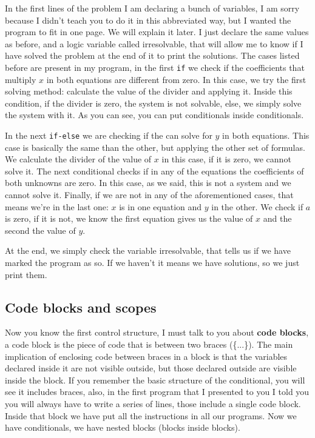 \documentclass[a4paper]{article}
\begin{document}
In the first lines of the problem I am declaring a bunch of variables, I am
sorry because I didn't teach you to do it in this abbreviated way, but I wanted
the program to fit in one page. We will explain it later. I just declare
the same values as before, and a logic variable called irresolvable, that will
allow me to know if I have solved the problem at the end of it to
print the solutions.
The cases listed before are  present in my program, in the first \texttt{if}
we check if the coefficients that multiply $x$ in both equations are different
from zero. In this case, we try the first solving method: calculate the value
of the divider and applying it. Inside this condition, if the divider is zero,
the system is not solvable, else, we simply solve the system with it.
As you can see, you can put conditionals inside conditionals.

In the next \texttt{if-else} we are checking if the can solve for $y$ in both
equations. This case is basically the same than the other, but applying the
other set of formulas. We calculate the divider of the value of $x$ in this
case, if it is zero, we cannot solve it.
The next conditional checks if in any of the equations the coefficients of
both unknowns are zero. In this case, as we said, this is not a system and we
cannot solve it.
Finally, if we are not in any of the aforementioned cases, that means we're in
the last one: $x$ is in one equation and $y$ in the other. We check if $a$ is
zero, if it is not, we know the first equation gives us the value of $x$ and
the second the value of $y$.

At the end, we simply check the variable irresolvable, that tells us if we have
marked the program as so. If we haven't it means we have solutions, so we just
print them.

\subsection{Code blocks and scopes}
Now you know the first control structure, I must talk to you about \textbf{code
blocks}, a code block is the piece of code that is between two braces (\{...\}).
The main implication of enclosing code between braces in a block is that the
variables declared inside it are not visible outside, but those declared outside
are visible inside the block.
If you remember the basic structure of the conditional, you will see it includes
braces, also, in the first program that I presented to you I told you you will
always have to write a series of lines, those include a single code block.
Inside that block we have put all the instructions in all our programs. Now
we have conditionals, we have nested blocks (blocks inside blocks).
\end{document}
